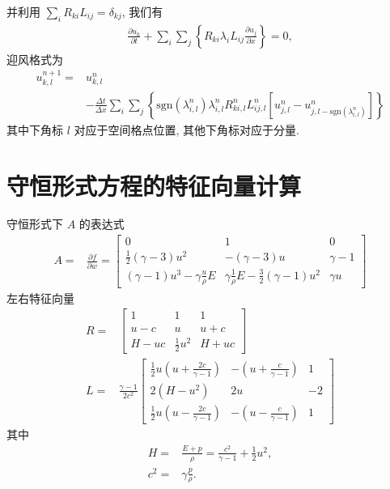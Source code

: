 \documentclass[10.5pt
]{article}
\begin{document}
并利用 $\sum_i R_{ki} L_{ij} = \delta_{kj}$, 我们有
\begin{align}
\frac{\partial u_k}{\partial t} + \sum_i \sum_j \left\{R_{ki} \lambda_i L_{ij} \frac{\partial
u_j}{\partial x}\right\} = 0,
\end{align}
迎风格式为
\begin{align}
u_{k,l}^{n+1} =& u_{k,l}^n \nonumber\\
& - \frac{\Delta t}{\Delta x} \sum_i \sum_j \left\{\text{sgn}(\lambda_{i,l}^n)
 \lambda_{i,l}^n R_{ki,l}^n L_{ij,l}^n \left[u_{j,l}^n - u_{j,l-\text{sgn}(\lambda_{i,l}^n)}^n\right]\right\}
\end{align}
其中下角标 $l$ 对应于空间格点位置, 其他下角标对应于分量.

\section{守恒形式方程的特征向量计算}\label{Appendix}
守恒形式下 $A$ 的表达式
\begin{align*}
A =& \frac{\partial f}{\partial w} = \left[\begin{array}{ccc} 0 & 1 & 0
\\
\frac{1}{2} (\gamma  - 3) u^2 & -(\gamma - 3) u & \gamma - 1
\\
(\gamma - 1) u^3 - \gamma \frac{u}{\rho} E & \gamma \frac{1}{\rho} E-\frac{3}{2} (\gamma
- 1) u^2 & \gamma u
\end{array}
\right]
\end{align*}
左右特征向量
\begin{align*}
R =& \left[\begin{array}{ccc} 1 & 1 & 1
\\
u - c & u & u + c
\\
H - u c & \frac{1}{2} u^2 & H + u c
\end{array}
\right]
\\
L =& \frac{\gamma - 1}{2 c^2} \left[\begin{array}{ccc} \frac{1}{2} u \left(u + \frac{2
c}{\gamma - 1}\right) & -\left(u + \frac{c}{\gamma - 1}\right) & 1
\\
2(H - u^2) & 2 u & - 2
\\
\frac{1}{2} u \left(u - \frac{2 c}{\gamma - 1}\right) & -\left(u - \frac{c}{\gamma -
1}\right) & 1
\end{array}
\right]
\end{align*}
其中
\begin{align*}
H =& \frac{E + p}{\rho} = \frac{c^2}{\gamma - 1} + \frac{1}{2} u^2,
\\
c^2 =& \gamma \frac{p}{\rho}.
\end{align*}
\end{document}
